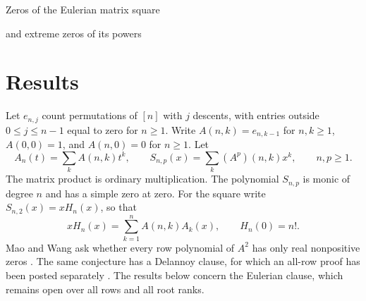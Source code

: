 \documentclass[11pt]{article}
\begin{document}
\begin{center}
{\LARGE Zeros of the Eulerian matrix square\par}
\vspace{0.2\baselineskip}
{\LARGE and extreme zeros of its powers\par}
\end{center}
\begin{abstract}
Let \(A\) be the shifted Eulerian matrix, whose entry \(A(n,k)\) counts permutations of \([n]\) with \(k-1\) descents. For the row polynomials of the ordinary square \(A^2\), we prove that all nonzero zeros in each fixed closed disk are eventually simple and negative, with local interlacing of successive rows in each fixed annulus. The logarithms of the magnitudes have a Cauchy limit with scale \(\pi\). At least \(n-O(n^{2/3})\) simple negative zeros of row \(n\) lie in a window \(|\log(-x)|=O(n^{1/3})\). We also give asymptotic formulas and successive-row inequalities at each fixed extreme rank. At the large-modulus end of a fixed ordinary power \(A^p\), the zeros occur in clusters of \(p\) at successive exponential scales. The proofs use Eulerian pole expansions, a factorial integral, and coefficient limits on exponential scales.
\end{abstract}

\section{Results}

Let \(e_{n,j}\) count permutations of \([n]\) with \(j\) descents, with entries outside \(0\le j\le n-1\) equal to zero for \(n\ge1\). Write \(A(n,k)=e_{n,k-1}\) for \(n,k\ge1\), \(A(0,0)=1\), and \(A(n,0)=0\) for \(n\ge1\). Let
\[
 A_n(t)=\sum_k A(n,k)t^k,\qquad
 S_{n,p}(x)=\sum_k (A^p)(n,k)x^k,\qquad n,p\ge1.
\]
The matrix product is ordinary multiplication. The polynomial \(S_{n,p}\) is monic of degree \(n\) and has a simple zero at zero. For the square write \(S_{n,2}(x)=xH_n(x)\), so that
\begin{equation}\label{eq:row}
 xH_n(x)=\sum_{k=1}^n A(n,k) A_k(x),\qquad H_n(0)=n!.
\end{equation}
Mao and Wang ask whether every row polynomial of \(A^2\) has only real nonpositive zeros \cite[Conjecture 4.1]{MW}. The same conjecture has a Delannoy clause, for which an all-row proof has been posted separately \cite{Delannoy}. The results below concern the Eulerian clause, which remains open over all rows and all root ranks.
\end{document}
